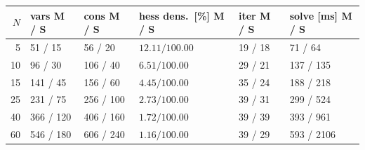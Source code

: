\begin{tabular}{rlllll}
  \toprule
  $N$ & vars M / S & cons M / S & hess dens.\ [\%] M / S & iter M / S & solve [ms] M / S \\
  \midrule
  5 & 51 / 15 & 56 / 20 & $12.11 / 100.00$ & 19 / 18 & 71 / 64 \\
  10 & 96 / 30 & 106 / 40 & $6.51 / 100.00$ & 29 / 21 & 137 / 135 \\
  15 & 141 / 45 & 156 / 60 & $4.45 / 100.00$ & 35 / 24 & 188 / 218 \\
  25 & 231 / 75 & 256 / 100 & $2.73 / 100.00$ & 39 / 31 & 299 / 524 \\
  40 & 366 / 120 & 406 / 160 & $1.72 / 100.00$ & 39 / 39 & 393 / 961 \\
  60 & 546 / 180 & 606 / 240 & $1.16 / 100.00$ & 39 / 29 & 593 / 2106 \\
  \bottomrule
\end{tabular}
